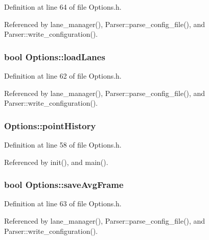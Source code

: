 \-Definition at line 64 of file \-Options.\-h.



\-Referenced by lane\-\_\-manager(), \-Parser\-::parse\-\_\-config\-\_\-file(), and \-Parser\-::write\-\_\-configuration().

\hypertarget{class_options_a07cdcfd5edc191ee49ad01c71688789a}{
\subsubsection[{load\-Lanes}]{\setlength{\rightskip}{0pt plus 5cm}bool {\bf \-Options\-::load\-Lanes}}}
\label{class_options_a07cdcfd5edc191ee49ad01c71688789a}


\-Definition at line 62 of file \-Options.\-h.



\-Referenced by lane\-\_\-manager(), \-Parser\-::parse\-\_\-config\-\_\-file(), and \-Parser\-::write\-\_\-configuration().

\hypertarget{class_options_af83140b97a9529d40535a4faac829326}{
\subsubsection[{point\-History}]{ {\bf \-Options\-::point\-History}}}
\label{class_options_af83140b97a9529d40535a4faac829326}


\-Definition at line 58 of file \-Options.\-h.



\-Referenced by init(), and main().

\hypertarget{class_options_a72803ea5d520c02502a72885fc1d7d00}{
\subsubsection[{save\-Avg\-Frame}]{\setlength{\rightskip}{0pt plus 5cm}bool {\bf \-Options\-::save\-Avg\-Frame}}}
\label{class_options_a72803ea5d520c02502a72885fc1d7d00}


\-Definition at line 63 of file \-Options.\-h.



\-Referenced by lane\-\_\-manager(), \-Parser\-::parse\-\_\-config\-\_\-file(), and \-Parser\-::write\-\_\-configuration().

